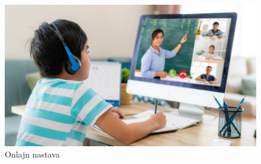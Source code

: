 \documentclass[a4paper]{article}
\begin{document}
\begin{figure}[ht!]
\begin{center}
\includegraphics[scale=0.23]{online.jpg}
\end{center}
\caption{Onlajn nastava}
\label{fig:online}
\end{figure}
\end{document}
